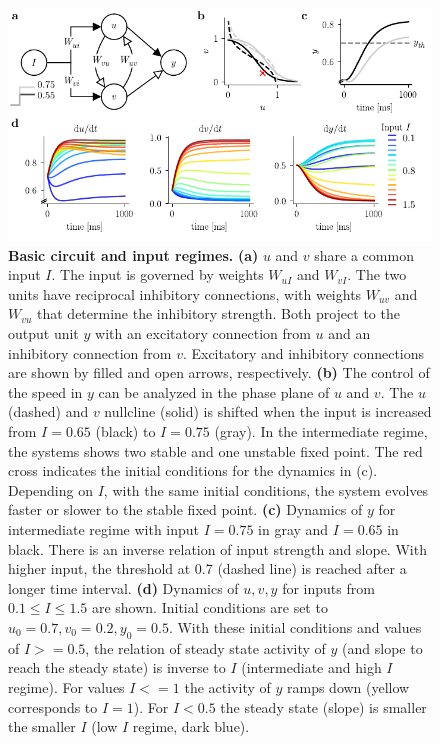 \documentclass[10pt]{article}
\begin{document}
\begin{figure}[ht]
	\centering
	\includegraphics{figures/defCircuit_nullcl.pdf}
	\caption{\textbf{Basic circuit and input regimes.} 
	\textbf{(a)} $u$ and $v$ share a common input $I$. The input is governed by weights $W_{uI}$ and $W_{vI}$. The two units have reciprocal inhibitory connections, with weights $W_{uv}$ and $W_{vu}$ that determine the inhibitory strength. Both project to the output unit $y$ with an excitatory connection from $u$ and an inhibitory connection from $v$. Excitatory and inhibitory connections are shown by filled and open arrows, respectively. 
	\textbf{(b)} The control of the speed in $y$ can be analyzed in the phase plane of $u$ and $v$. The $u$ (dashed) and $v$ nullcline (solid) is shifted when the input is increased from $I=0.65$ (black) to $I=0.75$ (gray). In the intermediate regime, the systems shows two stable and one unstable fixed point. The red cross indicates the initial conditions for the dynamics in (c). Depending on $I$, with the same initial conditions, the system evolves faster or slower to the stable fixed point. 
	\textbf{(c)} Dynamics of $y$ for intermediate regime with input $I=0.75$ in gray and $I=0.65$ in black. There is an inverse relation of input strength and slope. With higher input, the threshold at 0.7 (dashed line) is reached after a longer time interval. 
	\textbf{(d)} Dynamics of $u, v, y$ for inputs from $0.1\leq I \leq 1.5$ are shown. Initial conditions are set to $u_0=0.7, v_0=0.2, y_0=0.5$. With these initial conditions and values of $I>=0.5$, the relation of steady state activity of $y$ (and slope to reach the steady state) is inverse to $I$ (intermediate and high $I$ regime). For values $I<=1$ the activity of $y$ ramps down (yellow corresponds to $I=1$). For $I<0.5$ the steady state (slope) is smaller the smaller $I$ (low $I$ regime, dark blue).}
\label{fig:circuit}
\end{figure}
\end{document}
